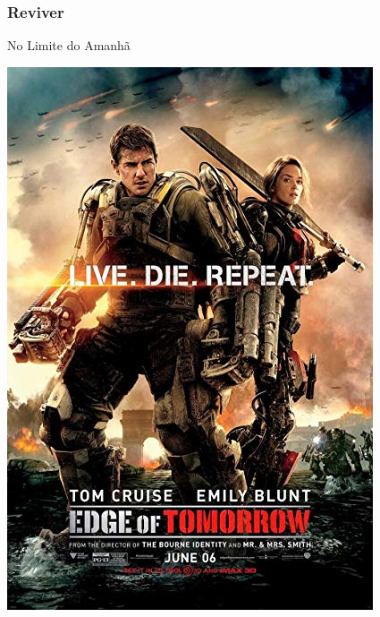 \begin{frame}
    \frametitle{Reviver}
    
    \alert{No Limite do Amanhã}

    \includegraphics[height=0.8\textheight]{img/posters/edge_of_tomorrow.jpg}
\end{frame}

